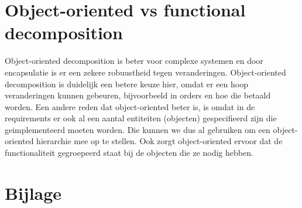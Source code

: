 \documentclass[•]{article}
\begin{document}
\section{Object-oriented vs functional decomposition}
Object-oriented decomposition is beter voor complexe systemen en door encapsulatie is er een zekere robuustheid tegen veranderingen. Object-oriented decomposition is duidelijk een betere keuze hier, omdat er een hoop veranderingen kunnen gebeuren, bijvoorbeeld in orders en hoe die betaald worden. Een andere reden dat object-oriented beter is, is omdat in de requirements er ook al een aantal entiteiten (objecten) gespecifieerd zijn die geimplementeerd moeten worden. Die kunnen we dus al gebruiken om een object-oriented hierarchie mee op te stellen.  Ook zorgt object-oriented ervoor dat de functionaliteit gegroepeerd staat bij de objecten die ze nodig hebben. 


\newpage

\section{Bijlage}
\end{document}
